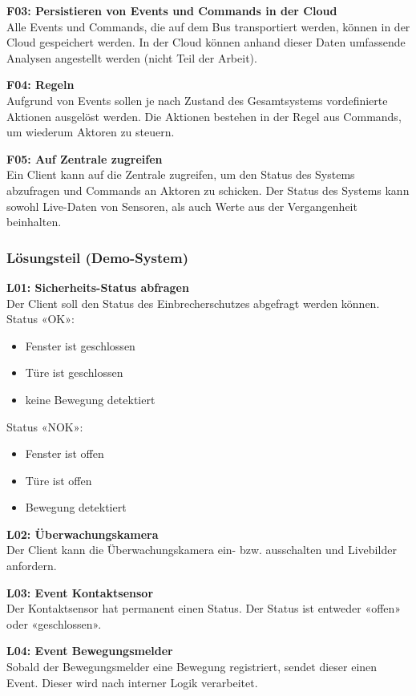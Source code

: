 \textbf{F03: Persistieren von Events und Commands in der Cloud} \\
Alle Events und Commands, die auf dem Bus transportiert werden, können in der Cloud gespeichert werden. In der Cloud können anhand dieser Daten umfassende Analysen angestellt werden (nicht Teil der Arbeit).

\textbf{F04: Regeln} \\
Aufgrund von Events sollen je nach Zustand des Gesamtsystems vordefinierte Aktionen ausgelöst werden. Die Aktionen bestehen in der Regel aus Commands, um wiederum Aktoren zu steuern.

\textbf{F05: Auf Zentrale zugreifen} \\
Ein Client kann auf die Zentrale zugreifen, um den Status des Systems abzufragen und Commands an Aktoren zu schicken. Der Status des Systems kann sowohl Live-Daten von Sensoren, als auch Werte aus der Vergangenheit beinhalten.

\subsubsection{Lösungsteil (Demo-System)}
\label{sec:requirementsSolutionPart}

\textbf{L01: Sicherheits-Status abfragen} \\
Der Client soll den Status des Einbrecherschutzes abgefragt werden können. \\
Status «OK»:
\begin{itemize}
	\item Fenster ist geschlossen
	\item Türe ist geschlossen
	\item keine Bewegung detektiert
\end{itemize}
Status «NOK»:
\begin{itemize}
	\item Fenster ist offen
	\item Türe ist offen
	\item Bewegung detektiert
\end{itemize}

\textbf{L02: Überwachungskamera} \\
Der Client kann die Überwachungskamera ein- bzw. ausschalten und Livebilder anfordern.

\textbf{L03: Event Kontaktsensor} \\
Der Kontaktsensor hat permanent einen Status. Der Status ist entweder «offen» oder «geschlossen».

\textbf{L04: Event Bewegungsmelder} \\
Sobald der Bewegungsmelder eine Bewegung registriert, sendet dieser einen Event. Dieser wird nach interner Logik verarbeitet.

